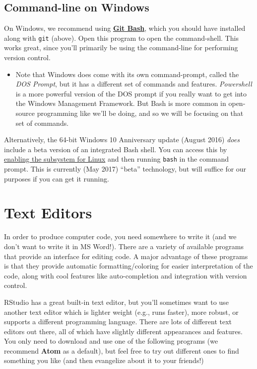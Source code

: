 \documentclass[]{book}
\providecommand{\tightlist}{%
  \setlength{\itemsep}{0pt}\setlength{\parskip}{0pt}}
\theoremstyle{definition}
\theoremstyle{definition}
\theoremstyle{remark}
\begin{document}
\subsection{Command-line on Windows}\label{command-line-on-windows}

On Windows, we recommend using
\href{https://git-scm.com/downloads}{\textbf{Git Bash}}, which you
should have installed along with \texttt{git} (above). Open this program
to open the command-shell. This works great, since you'll primarily be
using the command-line for performing version control.

\begin{itemize}
\tightlist
\item
  Note that Windows does come with its own command-prompt, called the
  \emph{DOS Prompt}, but it has a different set of commands and
  features. \emph{Powershell} is a more powerful version of the DOS
  prompt if you really want to get into the Windows Management
  Framework. But Bash is more common in open-source programming like
  we'll be doing, and so we will be focusing on that set of commands.
\end{itemize}

Alternatively, the 64-bit Windows 10 Anniversary update (August 2016)
\emph{does} include a beta version of an integrated Bash shell. You can
access this by
\href{https://msdn.microsoft.com/en-us/commandline/wsl/install_guide}{enabling
the subsystem for Linux} and then running \texttt{bash} in the command
prompt. This is currently (May 2017) ``beta'' technology, but will
suffice for our purposes if you can get it running.

\section{Text Editors}\label{text-editors}

In order to produce computer code, you need somewhere to write it (and
we don't want to write it in MS Word!). There are a variety of available
programs that provide an interface for editing code. A major advantage
of these programs is that they provide automatic formatting/coloring for
easier interpretation of the code, along with cool features like
auto-completion and integration with version control.

RStudio has a great built-in text editor, but you'll sometimes want to
use another text editor which is lighter weight (e.g., runs faster),
more robust, or supports a different programming language. There are
lots of different text editors out there, all of which have slightly
different appearances and features. You only need to download and use
one of the following programs (we recommend \textbf{Atom} as a default),
but feel free to try out different ones to find something you like (and
then evangelize about it to your friends!)
\end{document}
